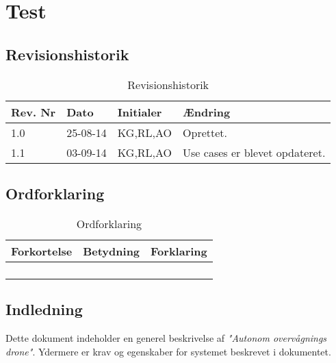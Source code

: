\chapter{Test}

\section{Revisionshistorik}

\begin{table}[H]
	\centering
		\begin{tabular}{|l|l|l|p{5 cm}|} 
		\hline
			Rev. Nr & Dato		& Initialer 	& Ændring \\ \hline
			1.0 	& 25-08-14	& KG,RL,AO		& Oprettet.	\\ \hline
			1.1 	& 03-09-14	& KG,RL,AO		& Use cases er blevet opdateret.\\ \hline
		\end{tabular}
	\caption{Revisionshistorik}
\end{table}

\section{Ordforklaring}


\begin{table}[H]
	\centering
		\begin{tabular}{|p{3 cm}|p{3 cm}|p{3 cm}|} 
		\hline
			Forkortelse & Betydning & Forklaring \\ \hline
			& & \\ \hline
			& & \\ \hline
			& & \\ \hline
			& & \\ \hline
		\end{tabular}
	\caption{Ordforklaring}
\end{table}


\section{Indledning}

Dette dokument indeholder en generel beskrivelse af \textit{"Autonom overvågnings drone"}. Ydermere er krav og egenskaber for systemet beskrevet i dokumentet.